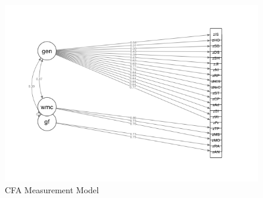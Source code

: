 \documentclass[12pt,]{book}
\begin{document}
\begin{figure}

{\centering \includegraphics[width=1\linewidth]{img/measurementModel} 

}

\caption{CFA Measurement Model}\label{fig:measurementmodel}
\end{figure}
\end{document}
